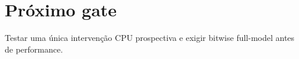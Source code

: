 \section{Próximo gate}
Testar uma única intervenção CPU prospectiva e exigir bitwise full-model antes de performance.
